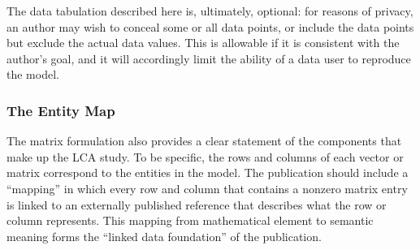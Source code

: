 The data tabulation described here is, ultimately, optional: for reasons of privacy, an author may wish to conceal some or all data points, or include the data points but exclude the actual data values.  This is allowable if it is consistent with the author's goal, and it will accordingly limit the ability of a data user to reproduce the model. 

\subsubsection{The Entity Map}


The matrix formulation also provides a clear statement of the components that make up the LCA study.  To be specific, the rows and columns of each vector or matrix correspond to the entities in the model.  The publication should include a ``mapping'' in which every row and column that contains a nonzero matrix entry is linked to an externally published reference that describes what the row or column represents.  This mapping from mathematical element to semantic meaning forms the ``linked data foundation'' of the publication.


